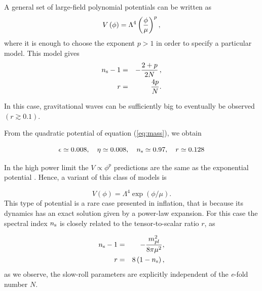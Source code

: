 \documentclass{rmaa}
\begin{document}
\noindent
 A general set of large-field polynomial potentials can be written as
%
\begin{equation}
V\left(\phi\right) = \Lambda^4 \left({\phi \over \mu}\right)^p,
\end{equation}
where it is enough to choose the exponent $p>1$ in order to specify a particular model.
%
This model gives
\begin{eqnarray}
n_{\rm s}-1&=&-\frac{2+p}{2N}\, ,\nonumber\\
r&=&\frac{4 p}{N}.
\end{eqnarray}

\noindent
In this case, gravitational waves can be sufficiently big to eventually be observed $(r\gtrsim 0.1)$.

From the quadratic potential of equation (\ref{eq:mass}), we obtain

\begin{equation}
\epsilon \simeq 0.008, \quad \eta \simeq 0.008, \quad n_{\rm s} \simeq 0.97, \quad r \simeq 0.128
\end{equation}

\noindent
In the high power limit the $V \propto \phi^p$ predictions are the same as the exponential 
potential \citep{La}. Hence, a variant of this class of models is 

\begin{equation}
V\left(\phi\right) = \Lambda^4 \exp\left(\phi / \mu\right).
\end{equation}
%
 This type of potential is a rare case presented in inflation, that is because its 
 dynamics has an exact solution given by a power-law expansion.
 For this case the spectral index $n_{\rm s}$ is closely related to the tensor-to-scalar ratio $r$, as 

\begin{eqnarray}
n_{\rm s}-1&=&-\frac{m^2_{pl}}{8\pi \mu^2}, \nonumber \\
r &=& 8 \left(1 - n_{\rm s}\right),
\end{eqnarray}
%
as we observe, the slow-roll parameters are explicitly independent of the \textit{e}-fold number $N$. 
\end{document}
